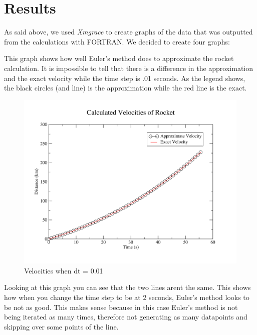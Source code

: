 \documentclass[11pt]{article}
\begin{document}
\section{Results}
As said above, we used \textit{Xmgrace} to create graphs of the data that was outputted from the calculations with FORTRAN. We decided to create four graphs:

\vspace{0.25cm}

\newpage
This graph shows how well Euler's method does to approximate the rocket calculation. It is impossible to tell that there is a difference in the approximation and the exact velocity while the time step is .01 seconds. As the legend shows, the black circles (and line) is the approximation while the red line is the exact.
\begin{figure}[H]
\centering
\includegraphics[scale=0.45]{velocity01.pdf}
\caption{Velocities when dt = 0.01}
\end{figure}
\newpage
Looking at this graph you can see that the two lines arent the same. This shows how when you change the time step to be at 2 seconds, Euler's method looks to be not as good. This makes sense because in this case Euler's method is not being iterated as many times, therefore not generating as many datapoints and skipping over some points of the line.
\end{document}

